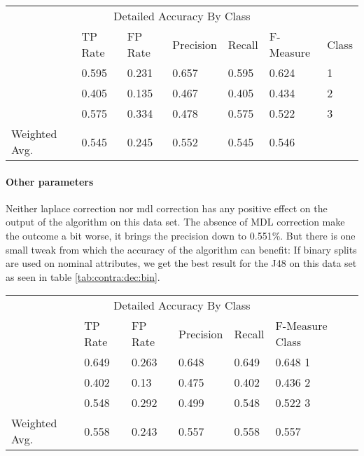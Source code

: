 \documentclass[paper=a4, fontsize=11pt]{scrartcl} %
\numberwithin{equation}{section} %
\numberwithin{figure}{section} %
\numberwithin{table}{section} %
\begin{document}
\begin{table*}[htb]\centering
  \begin{tabular*}{\columnwidth}{@{}lllllll@{}}
      \toprule 
      \multicolumn{7}{c}{Detailed Accuracy By Class} \\ 
              &   TP Rate & FP Rate & Precision & Recall & F-Measure &  Class \\ \midrule      
              &   0.595   & 0.231   & 0.657     & 0.595  & 0.624     &  1     \\      
              &   0.405   & 0.135   & 0.467     & 0.405  & 0.434     &  2     \\      
              &   0.575   & 0.334   & 0.478     & 0.575  & 0.522     &  3     \\      
Weighted Avg. &   0.545   & 0.245   & 0.552     & 0.545  & 0.546     &        \\ \bottomrule     
    \end{tabular*}
\caption{Decision Tree on Contraceptive Data Set -- at least 23 instances per leaf} 
\label{tab:contra:dec:23l}
\end{table*}
\FloatBarrier
\paragraph{Other parameters}
Neither laplace correction nor mdl correction has any positive effect on the output of the algorithm on this data set. The absence of MDL correction make the outcome a bit worse, it brings the precision down to 0.551\%.  But there is one small tweak from which the accuracy of the algorithm can benefit: If binary splits are used on nominal attributes, we get the best result for the J48 on this data set as seen in table \ref{tab:contra:dec:bin}.

 
\begin{table*}[htb]\centering
  \begin{tabular*}{\columnwidth}{@{}lllllll@{}}
      \toprule 
      \multicolumn{7}{c}{Detailed Accuracy By Class} \\ 
               &  TP Rate & FP Rate & Precision & Recall & F-Measure  Class \\ \midrule   
               &  0.649   & 0.263   & 0.648     & 0.649  & 0.648      1     \\    
               &  0.402   & 0.13    & 0.475     & 0.402  & 0.436      2     \\        
               &  0.548   & 0.292   & 0.499     & 0.548  & 0.522      3     \\    
Weighted Avg.  &  0.558   & 0.243   & 0.557     & 0.558  & 0.557            \\ \bottomrule 
    \end{tabular*}
\caption{Decision Tree on Contraceptive Data Set -- using binary splits} 
\label{tab:contra:dec:bin}
\end{table*}
\FloatBarrier
\end{document}
